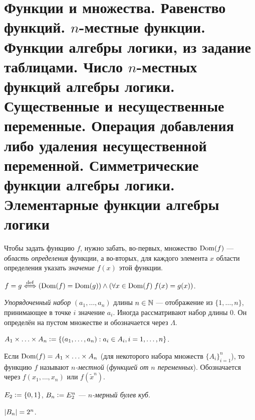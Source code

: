 \section{Функции и множества. Равенство функций. $n$-местные функции. Функции алгебры логики, из задание таблицами. Число $n$-местных функций алгебры логики. Существенные и несущественные переменные. Операция добавления либо удаления несущественной переменной. Симметрические функции алгебры логики. Элементарные функции алгебры логики}

\begin{definition}
    Чтобы задать функцию $f$, нужно забать, во-первых, множество $\operatorname{Dom}(f)$  --- \textit{область определения} функции, а во-вторых, для каждого элемента $x$ области определения указать \textit{значение} $f(x)$ этой функции.
\end{definition}

\begin{definition}
    $f = g \overset{\mathrm{def}}{\Longleftrightarrow} \left(\operatorname{Dom}(f) = \operatorname{Dom}(g)\right) \wedge \left(\forall x \in \operatorname{Dom}(f)\; f(x) = g(x)\right)$.
\end{definition}

\begin{definition}
    \textit{Упорядоченный набор} $(a_1, \ldots, a_n)$ длины $n \in \mathbb{N}$ --- отображение из $\{1, \ldots, n\}$, принимающее в точке $i$ значение $a_i$. Иногда рассматривают набор длины $0$. Он определён на пустом множестве и обозначается через $\Lambda$.
\end{definition}

\begin{definition}
    $A_1 \times \ldots \times A_n \vcentcolon = \{(a_1, \ldots, a_n) : a_i \in A_i, i = 1, \ldots, n\}$.
\end{definition}

\begin{definition}
    Если $\operatorname{Dom}(f) = A_1 \times \ldots \times A_n$ (для некоторого набора множеств $\{A_i\}_{i = 1}^n$), то функцию $f$ называют \textit{$n$-местной} (\textit{функцией от $n$ переменных}). Обозначается через $f(x_1, \ldots, x_n)$ или $f(\widetilde{x}^n)$.
\end{definition}

\begin{definition}
    $E_2 \vcentcolon = \{0, 1\}$, $B_n \vcentcolon = E_2^n$ --- \textit{$n$-мерный булев куб}.
\end{definition}

\begin{proposal}
    $\left\lvert B_n\right\rvert = 2^n$.
\end{proposal}

